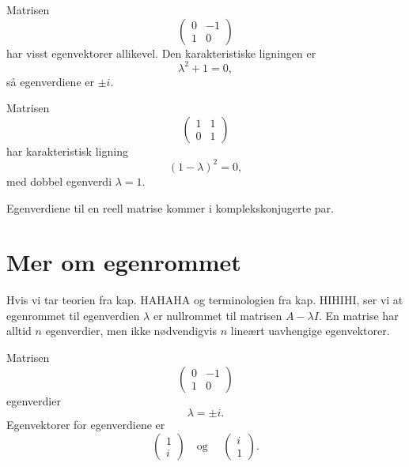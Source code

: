 \begin{ex}
Matrisen
\[
\begin{pmatrix}
0 & -1 \\ 1 &0
\end{pmatrix}
\]
har visst egenvektorer allikevel. Den karakteristiske ligningen er 
\[
\lambda^2+1=0,
\]
så egenverdiene er $\pm i$. 
\end{ex}

\begin{ex}
Matrisen
\[
\begin{pmatrix}
1 & 1 \\ 0 &1
\end{pmatrix}
\]
har karakteristisk ligning
\[
(1-\lambda)^2=0,
\]
med dobbel egenverdi $\lambda=1$. 
\end{ex}

\begin{thm}
Egenverdiene til en reell matrise kommer i komplekskonjugerte par.
\end{thm}

\section*{Mer om egenrommet}
Hvis vi tar teorien fra kap. HAHAHA og terminologien fra kap. HIHIHI, 
ser vi at egenrommet til egenverdien $\lambda$ er nullrommet til matrisen $A-\lambda I$.
En matrise har alltid $n$ egenverdier, 
men ikke nødvendigvis $n$ lineært uavhengige egenvektorer.

\begin{ex}
Matrisen
\[
\begin{pmatrix}
0 & -1 \\ 1 &0
\end{pmatrix}
\]
egenverdier
\[
\lambda=\pm i.
\] 
Egenvektorer for egenverdiene er 
\[
\begin{pmatrix}
1  \\ i
\end{pmatrix}
\quad \text{og }\quad
\begin{pmatrix}
i  \\ 1
\end{pmatrix}.
\]
\end{ex}

